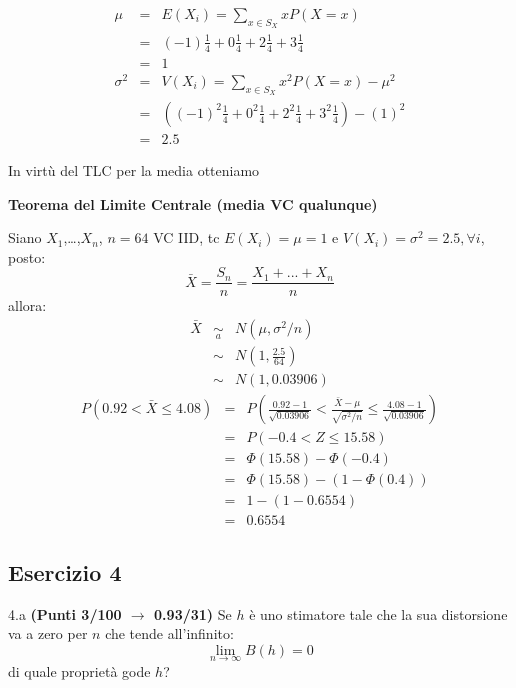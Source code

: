 \documentclass[
  11pt,
]{book}
\theoremstyle{mytheoremstyle}
\theoremstyle{mydefstyle}
\newenvironment{sol}
  {
  \begin{tcolorbox}[enhanced,breakable,arc=0.1mm,boxrule=1pt,colback=white,colframe=iblue,
  title=\bf \fontfamily{lmss}\selectfont \hspace{.5 cm} Soluzione,drop fuzzy shadow]

}{
\end{tcolorbox}
  }
\begin{document}
\begin{sol}
\begin{eqnarray*} \mu &=& E(X_i) = \sum_{x\in S_X}x P(X=x)\\ 
 &=& ( -1 ) \frac { 1 }{ 4 }+ 0  \frac { 1 }{ 4 }+ 2  \frac { 1 }{ 4 }+ 3  \frac { 1 }{ 4 } \\ 
            &=& 1 \\ 
 \sigma^2 &=& V(X_i) = \sum_{x\in S_X}x^2 P(X=x)-\mu^2\\ 
 &=&\left( ( -1 ) ^2\frac { 1 }{ 4 }+ 0  ^2\frac { 1 }{ 4 }+ 2  ^2\frac { 1 }{ 4 }+ 3  ^2\frac { 1 }{ 4 } \right)-( 1 )^2\\ 
            &=& 2.5 
\end{eqnarray*}

In virtù del TLC per la media otteniamo

\textbf{Teorema del Limite Centrale (media VC qualunque)}

Siano \(X_1\),\ldots,\(X_n\), \(n=64\) VC IID, tc \(E(X_i)=\mu=1\) e \(V(X_i)=\sigma^2=2.5,\forall i\), posto:
\[
      \bar X=\frac{S_n}n =\frac{X_1 + ... + X_n}n
      \]
allora:\begin{eqnarray*}
  \bar X & \mathop{\sim}\limits_{a}& N(\mu,\sigma^2/n) \\
     &\sim & N\left(1,\frac{2.5}{64}\right) \\
     &\sim & N(1,0.03906)
  \end{eqnarray*}\begin{eqnarray*}
   P( 0.92 < \bar X \leq  4.08 ) &=& P\left( \frac { 0.92  -  1 }{\sqrt{ 0.03906 }} < \frac { \bar X  -  \mu }{ \sqrt{\sigma^2/n} } \leq \frac { 4.08  -  1 }{\sqrt{ 0.03906 }}\right)  \\
              &=& P\left(  -0.4  < Z \leq  15.58 \right) \\
              &=& \Phi( 15.58 )-\Phi( -0.4 )\\
              &=&  \Phi( 15.58 )-(1-\Phi( 0.4 )) \\ &=&  1 -(1- 0.6554 ) \\ 
              &=&  0.6554 
   \end{eqnarray*}

\end{sol}

\subsection{Esercizio 4}\label{esercizio-4-7}

4.a \textbf{(Punti 3/100 \(\rightarrow\) 0.93/31)} Se \(h\) è uno stimatore tale che la sua distorsione va a zero per \(n\) che tende all'infinito:
\[
\lim_{n\to \infty}B(h)=0
\]
di quale proprietà gode \(h\)?
\end{document}

